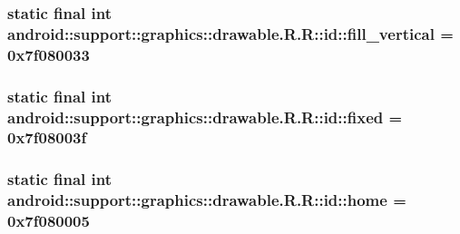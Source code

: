 \hypertarget{classandroid_1_1support_1_1graphics_1_1drawable_1_1_r_1_1id_9df9588ab5ea63cdd3ba4b02b5afc850}{
\subsubsection[{fill\_\-vertical}]{\setlength{\rightskip}{0pt plus 5cm}static final int android::support::graphics::drawable.R.R::id::fill\_\-vertical = 0x7f080033}}
\label{classandroid_1_1support_1_1graphics_1_1drawable_1_1_r_1_1id_9df9588ab5ea63cdd3ba4b02b5afc850}


\hypertarget{classandroid_1_1support_1_1graphics_1_1drawable_1_1_r_1_1id_39b8322e3c5100639ebbfef8dd03c583}{
\subsubsection[{fixed}]{\setlength{\rightskip}{0pt plus 5cm}static final int android::support::graphics::drawable.R.R::id::fixed = 0x7f08003f}}
\label{classandroid_1_1support_1_1graphics_1_1drawable_1_1_r_1_1id_39b8322e3c5100639ebbfef8dd03c583}


\hypertarget{classandroid_1_1support_1_1graphics_1_1drawable_1_1_r_1_1id_da0a539ee1f6445bf451e33e6008e894}{
\subsubsection[{home}]{\setlength{\rightskip}{0pt plus 5cm}static final int android::support::graphics::drawable.R.R::id::home = 0x7f080005}}
\label{classandroid_1_1support_1_1graphics_1_1drawable_1_1_r_1_1id_da0a539ee1f6445bf451e33e6008e894}


